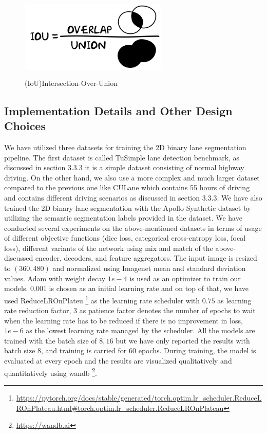          \begin{figure}[h]
    \centering
    \includegraphics[width=7cm, height=4cm]{images/IOU.png}
    \caption{(IoU)Intersection-Over-Union \footnotemark}
    \end{figure}
        
        \subsection{Implementation Details and Other Design Choices}
        We have utilized three datasets for training the 2D binary lane segmentation pipeline. The first dataset is called TuSimple lane detection benchmark\cite{Tusimple}, as discussed in section 3.3.3 it is a simple dataset consisting of normal highway driving. On the other hand, we also use a more complex and much larger dataset compared to the previous one like CULane\cite{pan2018SCNN} which contains 55 hours of driving and contains different driving scenarios as discussed in section 3.3.3. We have also trained the 2D binary lane segmentation with the Apollo Synthetic dataset\cite{guo2020gen} by utilizing the semantic segmentation labels provided in the dataset. We have conducted several experiments on the above-mentioned datasets in terms of usage of different objective functions (dice loss, categorical cross-entropy loss, focal loss), different variants of the network using mix and match of the above-discussed encoder, decoders, and feature aggregators. The input image is resized to $(360,480)$ and normalized using Imagenet\cite{deng2009imagenet} mean and standard deviation values. Adam\cite{Kingma2015AdamAM} with weight decay $1e-4$ is used as an optimizer to train our models. $0.001$ is chosen as an initial learning rate and on top of that, we have used ReduceLROnPlateu \footnote{\url{https://pytorch.org/docs/stable/generated/torch.optim.lr_scheduler.ReduceLROnPlateau.html#torch.optim.lr_scheduler.ReduceLROnPlateau}} as the learning rate scheduler with $0.75$ as learning rate reduction factor, $3$ as patience factor denotes the number of epochs to wait when the learning rate has to be reduced if there is no improvement in loss, $1e-6$ as the lowest learning rate managed by the scheduler. All the models are trained with the batch size of $8, 16$ but we have only reported the results with batch size $8$, and training is carried for $60$ epochs. During training, the model is evaluated at every epoch and the results are visualized qualitatively and quantitatively using wandb \footnote{\url{https://wandb.ai}}.
        
